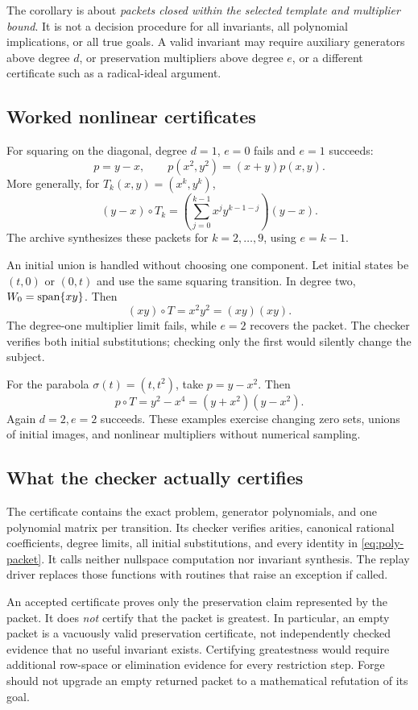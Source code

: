 The corollary is about \emph{packets closed within the selected template and
multiplier bound}. It is not a decision procedure for all invariants, all
polynomial implications, or all true goals. A valid invariant may require
auxiliary generators above degree $d$, or preservation multipliers above degree
$e$, or a different certificate such as a radical-ideal argument.

\subsection{Worked nonlinear certificates}
For squaring on the diagonal, degree $d=1$, $e=0$ fails and $e=1$ succeeds:
\[
 p=y-x,\qquad p(x^2,y^2)=(x+y)p(x,y).
\]
More generally, for $T_k(x,y)=(x^k,y^k)$,
\[
 (y-x)\circ T_k=
 \left(\sum_{j=0}^{k-1}x^jy^{k-1-j}\right)(y-x).
\]
The archive synthesizes these packets for $k=2,\ldots,9$, using $e=k-1$.

An initial union is handled without choosing one component. Let initial states
be $(t,0)$ or $(0,t)$ and use the same squaring transition. In degree two,
$W_0=\operatorname{span}\{xy\}$. Then
\[
 (xy)\circ T=x^2y^2=(xy)(xy).
\]
The degree-one multiplier limit fails, while $e=2$ recovers the packet. The
checker verifies both initial substitutions; checking only the first would
silently change the subject.

For the parabola $\sigma(t)=(t,t^2)$, take $p=y-x^2$. Then
\[
 p\circ T=y^2-x^4=(y+x^2)(y-x^2).
\]
Again $d=2,e=2$ succeeds. These examples exercise changing zero sets, unions of
initial images, and nonlinear multipliers without numerical sampling.

\subsection{What the checker actually certifies}
The certificate contains the exact problem, generator polynomials, and one
polynomial matrix per transition. Its checker verifies arities, canonical
rational coefficients, degree limits, all initial substitutions, and every
identity in \eqref{eq:poly-packet}. It calls neither nullspace computation nor
invariant synthesis. The replay driver replaces those functions with routines
that raise an exception if called.

An accepted certificate proves only the preservation claim represented by the
packet. It does \emph{not} certify that the packet is greatest. In particular,
an empty packet is a vacuously valid preservation certificate, not independently
checked evidence that no useful invariant exists. Certifying greatestness would
require additional row-space or elimination evidence for every restriction
step. Forge should not upgrade an empty returned packet to a mathematical
refutation of its goal.

